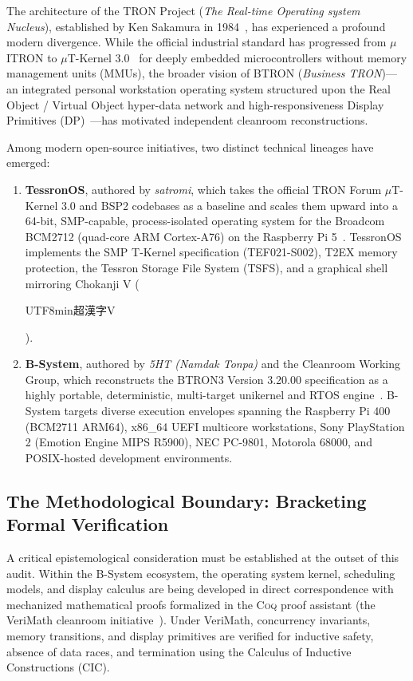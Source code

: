 \documentclass[10pt,journal,compsoc,twocolumn]{article}
\newcommand{\ja}[1]{\begin{CJK*}{UTF8}{min}#1\end{CJK*}}
\begin{document}
The architecture of the TRON Project (\emph{The Real-time Operating system Nucleus}), established by Ken Sakamura in 1984~\cite{sakamura1984tron}, has experienced a profound modern divergence. While the official industrial standard has progressed from $\mu$ITRON to $\mu$T-Kernel 3.0~\cite{mtk3spec} for deeply embedded microcontrollers without memory management units (MMUs), the broader vision of BTRON (\emph{Business TRON})---an integrated personal workstation operating system structured upon the Real Object / Virtual Object hyper-data network and high-responsiveness Display Primitives (DP)~\cite{btron3spec}---has motivated independent cleanroom reconstructions.

Among modern open-source initiatives, two distinct technical lineages have emerged:
\begin{enumerate}[leftmargin=*]
    \item \textbf{TessronOS}, authored by \emph{satromi}, which takes the official TRON Forum $\mu$T-Kernel 3.0 and BSP2 codebases as a baseline and scales them upward into a 64-bit, SMP-capable, process-isolated operating system for the Broadcom BCM2712 (quad-core ARM Cortex-A76) on the Raspberry Pi 5~\cite{tessronos_repo}. TessronOS implements the SMP T-Kernel specification (TEF021-S002), T2EX memory protection, the Tessron Storage File System (TSFS), and a graphical shell mirroring Chokanji V (\ja{超漢字V}).
    \item \textbf{B-System}, authored by \emph{5HT (Namdak Tonpa)} and the Cleanroom Working Group, which reconstructs the BTRON3 Version 3.20.00 specification as a highly portable, deterministic, multi-target unikernel and RTOS engine~\cite{sokhatsky2026btron}. B-System targets diverse execution envelopes spanning the Raspberry Pi 400 (BCM2711 ARM64), x86\_64 UEFI multicore workstations, Sony PlayStation 2 (Emotion Engine MIPS R5900), NEC PC-9801, Motorola 68000, and POSIX-hosted development environments.
\end{enumerate}

\subsection{The Methodological Boundary: Bracketing Formal Verification}
A critical epistemological consideration must be established at the outset of this audit. Within the B-System ecosystem, the operating system kernel, scheduling models, and display calculus are being developed in direct correspondence with mechanized mathematical proofs formalized in the \textsc{Coq} proof assistant (the VeriMath cleanroom initiative~\cite{sokhatsky2026verimath}). Under VeriMath, concurrency invariants, memory transitions, and display primitives are verified for inductive safety, absence of data races, and termination using the Calculus of Inductive Constructions (\textsc{CIC}).
\end{document}

